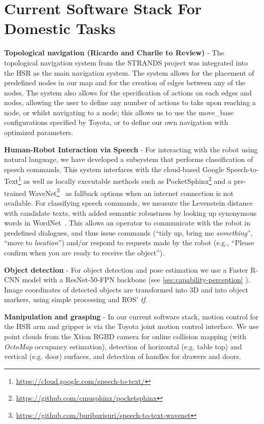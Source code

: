 \documentclass[runningheads,a4paper]{llncs}
\begin{document}
\section{Current Software Stack For Domestic Tasks}\label{sec:current-software-stack-for-domestic-tasks}
\textbf{Topological navigation (Ricardo and Charlie to Review)} - The topological navigation system from the STRANDS project was integrated into the HSR as the main navigation system. The system allows for the placement of predefined nodes in our map and for the creation of edges between any of the nodes. The system also allows for the specification of actions on each edges and nodes, allowing the user to define any number of actions to take upon reaching a node, or whilst navigating to a node; this allows us to use the move\_base configurations specified by Toyota, or to define our own navigation with optimized parameters. 

\textbf{Human-Robot Interaction via Speech} - For interacting with the robot using natural language, we have developed a subsystem that performs classification of speech commands. 
This system interfaces with the cloud-based Google Speech-to-Text\footnote{\url{https://cloud.google.com/speech-to-text/}} as well as locally executable methods such as PocketSphinx\footnote{\url{https://github.com/cmusphinx/pocketsphinx}} and a pre-trained WaveNet\footnote{\url{https://github.com/buriburisuri/speech-to-text-wavenet}}~\cite{oord2016wavenet} as fallback options when an internet connection is not available. 
For classifying speech commands, we measure the Levenstein distance with candidate texts, with added semantic robustness by looking up synonymous words in WordNet~\cite{miller1995wordnet}. 
This allows an operator to communicate with the robot in predefined dialogues, and thus issue commands (``tidy up, bring me \emph{something}'', ``move to \emph{location}'') and/or respond to requests made by the robot (e.g., ``Please confirm when you are ready to receive the object'').

\textbf{Object detection} - For object detection and pose estimation we use a Faster R-CNN model with a ResNet-50-FPN backbone (see \ref{sec:capability-perception} ). Image coordinates of detected objects are transformed into 3D  and into object markers, using simple processing and ROS' \textit{tf}.  

\textbf{Manipulation and grasping} - In our current software stack, motion control for the HSR arm and gripper is via the Toyota joint motion control interface.
%
We use point clouds from the Xtion RGBD camera for online collision mapping (with \textit{OctoMap} occupancy estimation), detection of horizontal (e.g. table top) and vertical (e.g. door) surfaces, and detection of handles for drawers and doors.
\end{document}

